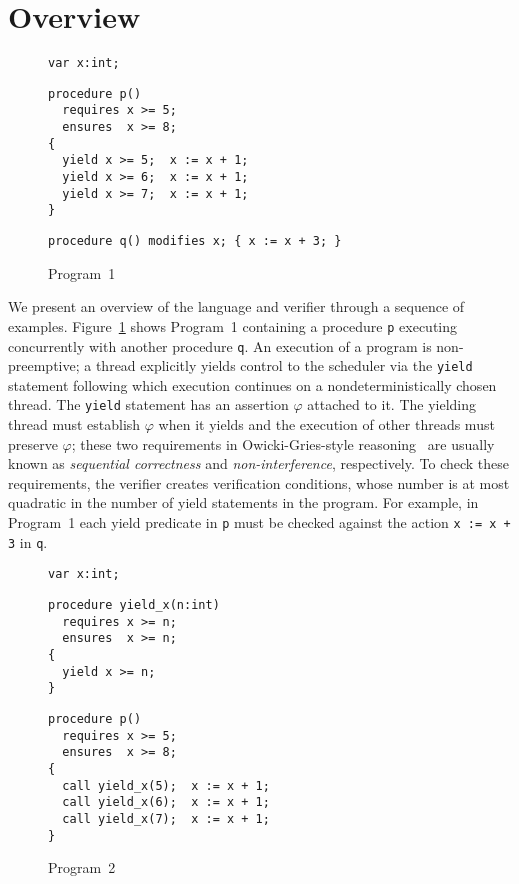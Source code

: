 \section{Overview}
\label{sec:overview}

\begin{figure}
\begin{verbatim}
var x:int;
\end{verbatim}
\begin{verbatim}
procedure p()
  requires x >= 5;
  ensures  x >= 8;
{
  yield x >= 5;  x := x + 1;
  yield x >= 6;  x := x + 1;
  yield x >= 7;  x := x + 1;
}
\end{verbatim}
\begin{verbatim}
procedure q() modifies x; { x := x + 3; }
\end{verbatim}
\caption{Program~1}
\label{fig:ex1}
\end{figure}

We present an overview of the \civl language and verifier through a sequence of examples.
Figure~\ref{fig:ex1} shows Program~1 containing a procedure {\tt p}
executing concurrently with another procedure {\tt q}. 
An execution of a \civl program is non-preemptive; a thread explicitly yields control to the
scheduler via the {\tt yield} statement following which execution continues on a 
nondeterministically chosen thread.
The {\tt yield} statement has an assertion $\varphi$ attached to it.
The yielding thread must establish $\varphi$ when it yields and the execution of other threads 
must preserve $\varphi$; these two requirements in Owicki-Gries-style
reasoning~\cite{OwickiG76} are usually known as {\em sequential correctness}
and {\em non-interference}, respectively.
To check these requirements, the \civl verifier creates verification conditions, whose number is at most
quadratic in the number of yield statements in the program.
For example, in Program~1 each yield predicate in {\tt p} must be checked against the action 
{\tt x := x + 3} in {\tt q}.


\begin{figure}
\begin{verbatim}
var x:int;
\end{verbatim}
\begin{verbatim}
procedure yield_x(n:int)
  requires x >= n;
  ensures  x >= n;
{
  yield x >= n;
}
\end{verbatim}
\begin{verbatim}
procedure p()
  requires x >= 5;
  ensures  x >= 8;
{
  call yield_x(5);  x := x + 1;
  call yield_x(6);  x := x + 1;
  call yield_x(7);  x := x + 1;
}
\end{verbatim}
\caption{Program~2}
\label{fig:ex2}
\end{figure}

